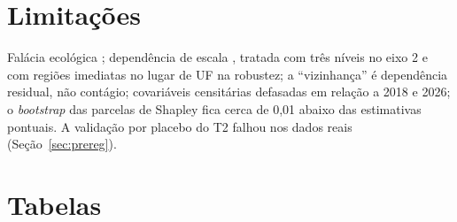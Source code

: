 \documentclass[11pt,a4paper]{article}
\begin{document}
\section{Limitações}

Falácia ecológica \citep{robinson1950}; dependência de escala \citep{openshaw1984}, tratada com três
níveis no eixo 2 e com regiões imediatas no lugar de UF na robustez; a ``vizinhança'' é dependência
residual, não contágio; covariáveis censitárias defasadas em relação a 2018 e 2026; o
\emph{bootstrap} das parcelas de Shapley fica cerca de 0,01 abaixo das estimativas pontuais.
\ifplacebook\else A validação por placebo do T2 falhou nos dados reais (Seção~\ref{sec:prereg}).\fi

\appendix
\section{Tabelas}

\begin{table}[htbp]\centering\small
\caption{Decomposição de Shapley do $R^2$ ajustado (eixo 1, blocos posicionais, estimativas pontuais).}\label{tab:eixo1}

\end{table}

\begin{table}[htbp]\centering\small
\caption{Salto nas divisas estaduais e na linha-placebo do pré-registro (p.p.; mediana e IC90\% do \emph{bootstrap}).}\label{tab:fronteira}

\end{table}

\begin{table}[htbp]\centering\small
\caption{Efeitos únicos das dimensões estruturais (eixo 4, blocos posicionais).}\label{tab:eixo4}
\resizebox{\linewidth}{!}{}
\end{table}

\begin{table}[htbp]\centering\small
\caption{Parcelas da variância de $\operatorname{logit}(A/(A+B))$ por nível (eixo 2).}\label{tab:eixo2}

\end{table}

\begin{table}[htbp]\centering\small
\caption{Isolamento e exposição (eixo 3).}\label{tab:eixo3}

\end{table}
\end{document}
